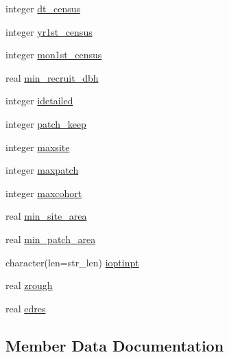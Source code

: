 \begin{DoxyCompactItemize}
\item 
integer \hyperlink{structename__coms_1_1ename__vars_acd4adb0912926306cac73aa6abd71d16}{dt\+\_\+census}
\item 
integer \hyperlink{structename__coms_1_1ename__vars_af95f646dffc7bafbdef282c1e0a0b915}{yr1st\+\_\+census}
\item 
integer \hyperlink{structename__coms_1_1ename__vars_ae40cd69d3cc0356ef74b6601983a7117}{mon1st\+\_\+census}
\item 
real \hyperlink{structename__coms_1_1ename__vars_a37fb5aa022f4e56a4ef81c559ef4e9de}{min\+\_\+recruit\+\_\+dbh}
\item 
integer \hyperlink{structename__coms_1_1ename__vars_a357ee72a65ad802f0b513dc1268da08b}{idetailed}
\item 
integer \hyperlink{structename__coms_1_1ename__vars_a294ad8776f6d095b807d079865c0a54d}{patch\+\_\+keep}
\item 
integer \hyperlink{structename__coms_1_1ename__vars_a99fff9e51d613657edd955243887f482}{maxsite}
\item 
integer \hyperlink{structename__coms_1_1ename__vars_a01e1c83c95742bf3eaefd9ae4ccfa2e6}{maxpatch}
\item 
integer \hyperlink{structename__coms_1_1ename__vars_aac6b1a6dacad31908a45c14d43a78b26}{maxcohort}
\item 
real \hyperlink{structename__coms_1_1ename__vars_ac833ed6581d85c10f8317a93d40cc9b8}{min\+\_\+site\+\_\+area}
\item 
real \hyperlink{structename__coms_1_1ename__vars_a273f97fba1fc90af65c28ee6d7f525d7}{min\+\_\+patch\+\_\+area}
\item 
character(len=str\+\_\+len) \hyperlink{structename__coms_1_1ename__vars_a5ca8f9177953711014581a411923bf61}{ioptinpt}
\item 
real \hyperlink{structename__coms_1_1ename__vars_a3d58740a12137c047498e7ea2e9482d7}{zrough}
\item 
real \hyperlink{structename__coms_1_1ename__vars_ad0785dccc376081a8249a9d2f4ddc43d}{edres}
\end{DoxyCompactItemize}


\subsection{Member Data Documentation}
\hypertarget{structename__coms_1_1ename__vars_a7a77bc951dacf24a3ac1538b524e9c1d}{}
